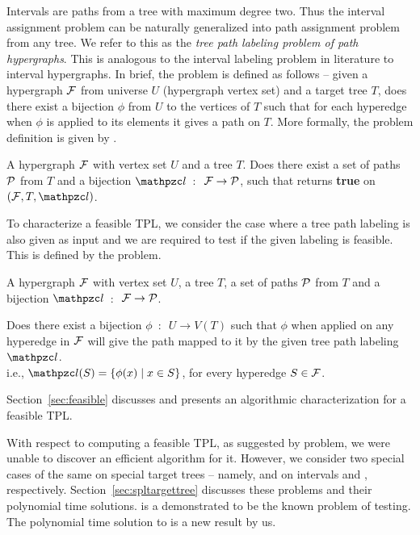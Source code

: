 Intervals are paths from a tree with maximum degree two. Thus the
interval assignment problem can be naturally generalized into path
assignment problem from any tree. We refer to this as the {\em tree
  path labeling problem of path hypergraphs}. This is analogous to the
interval labeling problem in literature \cite{kklv10} to interval
hypergraphs. In brief, the problem is defined as follows -- given a
hypergraph ${\cal F}$ from universe $U$ (\ie hypergraph vertex set) and a
target tree $T$, does there exist a bijection $\phi$ from $U$ to the
vertices of $T$ such that for each hyperedge when $\phi$ is applied to
its elements it gives a path on $T$.  More formally, the problem
definition is given by \CFTPL.

\begin{problemdef}{\CFTPL}{A hypergraph ${\cal F}$ with vertex set $U$ and
    a tree $T$.}
  Does there exist a set of paths ${\cal P}$ from $T$ and a bijection
  $\cl$~$:$~${\cal F} \rightarrow {\cal P}$, such that {\FTPL} returns {\bf
    true} on $(\cF, T, \cl)$.
\end{problemdef}

To characterize a feasible TPL, we consider the case where a tree path
labeling is also given as input and we are required to test if the
given labeling is feasible. This is defined by the \FTPL problem.

\begin{problemdef}{\FTPL}{A hypergraph ${\cal F}$ with vertex set $U$, a
    tree $T$, a set of paths ${\cal P}$ from $T$ and a bijection
    $\cl$~$:$~${\cal F} \rightarrow {\cal P}$.}

  Does there exist a bijection $\phi$~$:$~$U \rightarrow V(T)$ such
  that $\phi$ when applied on any hyperedge in ${\cal F}$ will give
  the path mapped to it by the given tree path labeling $\cl$.\\
  { i.e., $\cl(S) = \{\phi(x) \mid x \in S\}$, for every hyperedge $S
    \in {\cal F}$.}
\end{problemdef}

Section~\ref{sec:feasible} discusses \FTPL and presents an algorithmic
characterization for a feasible TPL.

With respect to computing a feasible TPL, as suggested by \CFTPL
problem, we were unable to discover an efficient algorithm for
it. However, we consider two special cases of the same on special
target trees -- namely, \CFTPLINT and \CFTPLKTREE on intervals and
\kstars, respectively.  Section~\ref{sec:spltargettree} discusses
these problems and their polynomial time solutions.  \CFTPLINT is a
demonstrated to be the known problem of \COP testing. The polynomial
time solution to \CFTPLKTREE is a new result by us.

